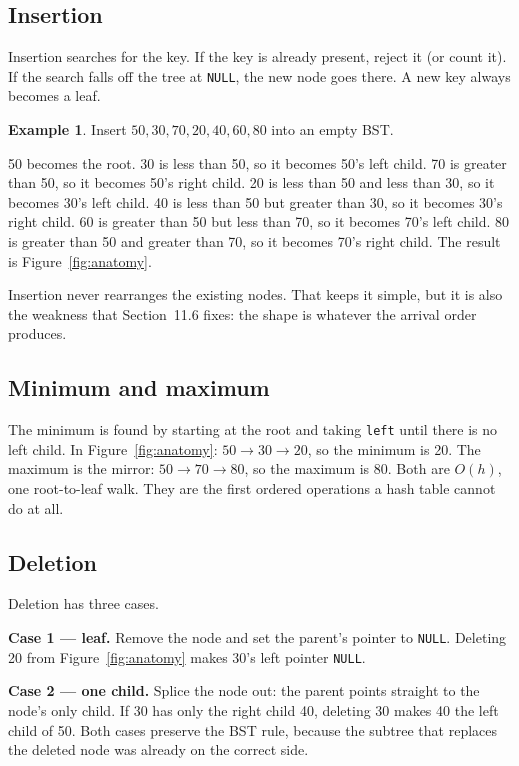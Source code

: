 \documentclass[11pt]{article}
\theoremstyle{definition}
\newtheorem{example}{Example}[section]
\begin{document}
\subsection{Insertion}

Insertion searches for the key. If the key is already present, reject it (or
count it). If the search falls off the tree at \texttt{NULL}, the new node
goes there. A new key always becomes a leaf.

\begin{example}
Insert $50,30,70,20,40,60,80$ into an empty BST.

50 becomes the root. 30 is less than 50, so it becomes 50's left child. 70 is
greater than 50, so it becomes 50's right child. 20 is less than 50 and less
than 30, so it becomes 30's left child. 40 is less than 50 but greater than
30, so it becomes 30's right child. 60 is greater than 50 but less than 70,
so it becomes 70's left child. 80 is greater than 50 and greater than 70, so
it becomes 70's right child. The result is Figure~\ref{fig:anatomy}.
\end{example}

Insertion never rearranges the existing nodes. That keeps it simple, but it
is also the weakness that Section~11.6 fixes: the shape is whatever the
arrival order produces.

\subsection{Minimum and maximum}

The minimum is found by starting at the root and taking \texttt{left} until
there is no left child. In Figure~\ref{fig:anatomy}: $50\to30\to20$, so the
minimum is 20. The maximum is the mirror: $50\to70\to80$, so the maximum is
80. Both are $O(h)$, one root-to-leaf walk. They are the first ordered
operations a hash table cannot do at all.

\subsection{Deletion}

Deletion has three cases.

\textbf{Case 1 --- leaf.} Remove the node and set the parent's pointer to
\texttt{NULL}. Deleting 20 from Figure~\ref{fig:anatomy} makes 30's left
pointer \texttt{NULL}.

\textbf{Case 2 --- one child.} Splice the node out: the parent points
straight to the node's only child. If 30 has only the right child 40,
deleting 30 makes 40 the left child of 50. Both cases preserve the BST rule,
because the subtree that replaces the deleted node was already on the correct
side.
\end{document}
